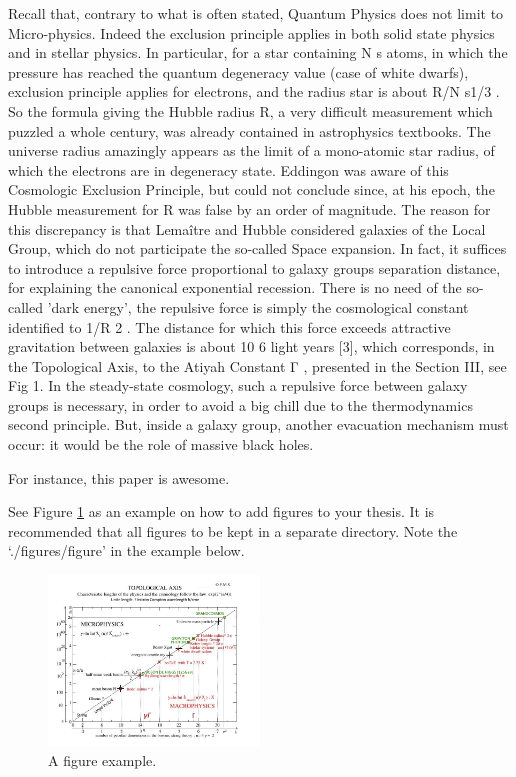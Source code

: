 Recall that, contrary to what is often stated, Quantum Physics does not limit to Micro-physics.
Indeed the exclusion principle applies in both solid state physics and in stellar physics. In particular,
for a star containing N s atoms, in which the pressure has reached the quantum degeneracy value
(case of white dwarfs), exclusion principle applies for electrons, and the radius star is about R/N s1/3 .
So the formula giving the Hubble radius R, a very difficult measurement which puzzled a whole
century, was already contained in astrophysics textbooks. The universe radius amazingly appears as
the limit of a mono-atomic star radius, of which the electrons are in degeneracy state. Eddingon was
aware of this Cosmologic Exclusion Principle, but could not conclude since, at his epoch, the
Hubble measurement for R was false by an order of magnitude.
The reason for this discrepancy is that Lemaître and Hubble considered galaxies of the Local
Group, which do not participate the so-called Space expansion. In fact, it suffices to introduce a
repulsive force proportional to galaxy groups separation distance, for explaining the canonical
exponential recession. There is no need of the so-called 'dark energy', the repulsive force is simply
the cosmological constant identified to 1/R 2 . The distance for which this force exceeds attractive
gravitation between galaxies is about 10 6 light years [3], which corresponds, in the Topological
Axis, to the Atiyah Constant Γ , presented in the Section III, see Fig 1.
In the steady-state cosmology, such a repulsive force between galaxy groups is necessary, in
order to avoid a big chill due to the thermodynamics second principle. But, inside a galaxy group,
another evacuation mechanism must occur: it would be the role of massive black holes.

For instance, this paper \cite{fm1} is awesome.

See Figure \ref{fig:figure_label} as an example on how to add figures to your thesis.
It is recommended that all figures to be kept in a separate directory.
Note the `./figures/figure' in the example below.


\begin{figure}
\centering
\includegraphics[width=0.5\textwidth]{./figures/figure}
\caption{A figure example.}
\label{fig:figure_label}
\end{figure}


